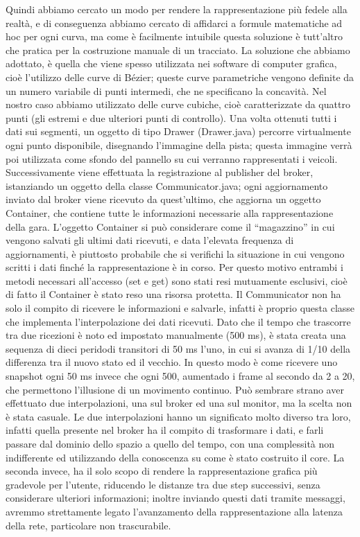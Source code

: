 Quindi abbiamo cercato un modo per rendere la rappresentazione più fedele alla realtà, e di conseguenza abbiamo cercato di affidarci a formule matematiche ad hoc per ogni curva, ma come è facilmente intuibile questa soluzione è tutt’altro che pratica per la costruzione manuale di un tracciato.
La soluzione che abbiamo adottato, è quella che viene spesso utilizzata nei software di computer grafica, cioè l’utilizzo delle curve di Bézier; queste curve parametriche vengono definite da un numero variabile di punti intermedi, che ne specificano la concavità. Nel nostro caso abbiamo utilizzato delle curve cubiche, cioè caratterizzate da quattro punti (gli estremi e due ulteriori punti di controllo).
Una volta ottenuti tutti i dati sui segmenti, un oggetto di tipo Drawer (Drawer.java) percorre virtualmente ogni punto disponibile, disegnando l’immagine della pista; questa immagine verrà poi utilizzata come sfondo del pannello su cui verranno rappresentati i veicoli.
Successivamente viene effettuata la registrazione al publisher del broker, istanziando un oggetto della classe Communicator.java; ogni aggiornamento inviato dal broker viene ricevuto da quest’ultimo, che aggiorna un oggetto Container, che contiene tutte le informazioni necessarie alla rappresentazione della gara. L’oggetto Container si può considerare come il “magazzino” in cui vengono salvati gli ultimi dati ricevuti, e data l’elevata frequenza di aggiornamenti, è piuttosto probabile che si verifichi la situazione in cui vengono scritti i dati finché la rappresentazione è in corso. Per questo motivo entrambi i metodi necessari all’accesso (set e get) sono stati resi mutuamente esclusivi, cioè di fatto il Container è stato reso una risorsa protetta. 
Il Communicator non ha solo il compito di ricevere le informazioni e salvarle, infatti è proprio questa classe che implementa l’interpolazione dei dati ricevuti. Dato che il tempo che trascorre tra due ricezioni è noto ed impostato manualmente (500 ms), è stata creata una sequenza di dieci peridodi transitori di 50 ms l’uno, in cui si avanza di 1/10 della differenza tra il nuovo stato ed il vecchio. In questo modo è come ricevere uno snapshot ogni 50 ms invece che ogni 500, aumentado i frame al secondo da 2 a 20, che permettono l’illusione di un movimento continuo.
Può sembrare strano aver effettuato due interpolazioni, una sul broker ed una sul monitor, ma la scelta non è stata casuale. Le due interpolazioni hanno un significato molto diverso tra loro, infatti quella presente nel broker ha il compito di trasformare i dati, e farli passare dal dominio dello spazio a quello del tempo, con una complessità non indifferente ed utilizzando della conoscenza su come è stato costruito il core. La seconda invece, ha il solo scopo di rendere la rappresentazione grafica più gradevole per l’utente, riducendo le distanze tra due step successivi, senza considerare ulteriori informazioni; inoltre inviando questi dati tramite messaggi, avremmo strettamente legato l’avanzamento della rappresentazione alla latenza della rete, particolare non trascurabile.
